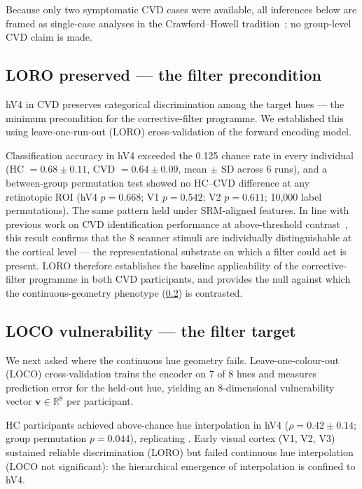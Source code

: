 Because only two symptomatic CVD cases were available, all inferences
below are framed as single-case analyses in the Crawford--Howell
tradition~\cite{crawford1998, schuett2023}; no group-level CVD claim is
made.

\subsection{LORO preserved --- the filter precondition}
\label{sec:results:loro}

hV4 in CVD preserves categorical discrimination among the target hues ---
the minimum precondition for the corrective-filter programme. We
established this using leave-one-run-out (LORO) cross-validation of the
forward encoding model.

Classification accuracy in hV4 exceeded the 0.125 chance rate in every
individual (HC $= 0.68 \pm 0.11$, CVD $= 0.64 \pm 0.09$, mean $\pm$ SD
across 6 runs), and a between-group permutation test showed no HC--CVD
difference at any retinotopic ROI (hV4 $p = 0.668$; V1 $p = 0.542$;
V2 $p = 0.611$; 10{,}000 label permutations). The same pattern held under
SRM-aligned features. In line with previous work on CVD identification
performance at above-threshold contrast~\cite{bosten2019, boehm2014}, this
result confirms that the 8 scanner stimuli are individually distinguishable
at the cortical level --- the representational substrate on which a filter
could act is present. LORO therefore establishes the baseline applicability
of the corrective-filter programme in both CVD participants, and provides the
null against which the continuous-geometry phenotype
(\cref{sec:results:loco}) is contrasted.

\subsection{LOCO vulnerability --- the filter target}
\label{sec:results:loco}

We next asked where the continuous hue geometry fails. Leave-one-colour-out
(LOCO) cross-validation trains the encoder on 7 of 8 hues and measures
prediction error for the held-out hue, yielding an 8-dimensional
vulnerability vector $\mathbf{v} \in \mathbb{R}^{8}$ per participant.

HC participants achieved above-chance hue interpolation in hV4
($\rho = 0.42 \pm 0.14$; group permutation $p = 0.044$), replicating
. Early visual cortex (V1, V2, V3) sustained reliable
discrimination (LORO) but failed continuous hue interpolation (LOCO not
significant): the hierarchical emergence of interpolation is confined to
hV4.

